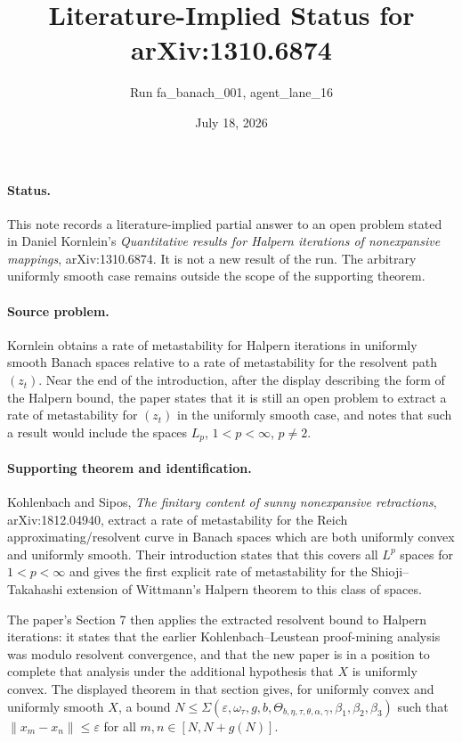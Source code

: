 \documentclass[11pt]{article}
\title{Literature-Implied Status for arXiv:1310.6874}
\author{Run fa\_banach\_001, agent\_lane\_16}
\date{July 18, 2026}
\begin{document}
\maketitle

\paragraph{Status.}
This note records a literature-implied partial answer to an open problem stated in Daniel Kornlein's
\emph{Quantitative results for Halpern iterations of nonexpansive mappings}, arXiv:1310.6874.
It is not a new result of the run. The arbitrary uniformly smooth case remains outside the scope of the supporting theorem.

\paragraph{Source problem.}
Kornlein obtains a rate of metastability for Halpern iterations in uniformly smooth Banach spaces relative to a rate of metastability for the resolvent path $(z_t)$.
Near the end of the introduction, after the display describing the form of the Halpern bound, the paper states that it is still an open problem to extract a rate of metastability for $(z_t)$ in the uniformly smooth case, and notes that such a result would include the spaces $L_p$, $1<p<\infty$, $p\neq 2$.

\paragraph{Supporting theorem and identification.}
Kohlenbach and Sipos, \emph{The finitary content of sunny nonexpansive retractions}, arXiv:1812.04940, extract a rate of metastability for the Reich approximating/resolvent curve in Banach spaces which are both uniformly convex and uniformly smooth. Their introduction states that this covers all $L^p$ spaces for $1<p<\infty$ and gives the first explicit rate of metastability for the Shioji--Takahashi extension of Wittmann's Halpern theorem to this class of spaces.

The paper's Section 7 then applies the extracted resolvent bound to Halpern iterations: it states that the earlier Kohlenbach--Leustean proof-mining analysis was modulo resolvent convergence, and that the new paper is in a position to complete that analysis under the additional hypothesis that $X$ is uniformly convex. The displayed theorem in that section gives, for uniformly convex and uniformly smooth $X$, a bound $N\leq\Sigma(\varepsilon,\omega_\tau,g,b,\Theta_{b,\eta,\tau,\theta,\alpha,\gamma},\beta_1,\beta_2,\beta_3)$ such that $\|x_m-x_n\|\leq\varepsilon$ for all $m,n\in[N,N+g(N)]$.
\end{document}
